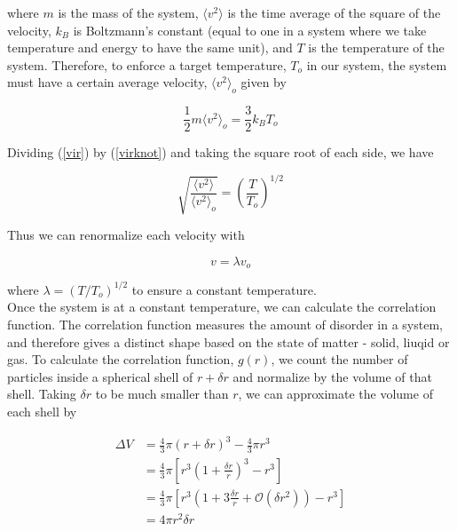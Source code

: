 \documentclass{article}
\begin{document}
\begin{multicols}{2}
\noindent where $m$ is the mass of the system, $\langle v^2 \rangle$ is the time average of the square of the velocity, $k_B$ is Boltzmann's constant (equal to one in a system where we take temperature and energy to have the same unit), and $T$ is the temperature of the system.  Therefore, to enforce a target temperature, $T_o$ in our system, the system must have a certain average velocity, $\langle v^2 \rangle _o$ given by

\begin{equation}
\label{virknot}
\frac{1}{2}m \langle v^2 \rangle _o = \frac{3}{2} k_B T_o
\end{equation}

Dividing (\ref{vir}) by (\ref{virknot}) and taking the square root of each side, we have

\begin{equation}
\sqrt{\frac{\langle v^2 \rangle}{\langle v^2 \rangle _o}} = \left ( \frac{T}{T_o} \right ) ^{1/2}
\end{equation}

\noindent Thus we can renormalize each velocity with 

\begin{equation}
v = \lambda v_o
\end{equation}

\noindent where $\lambda = (T/T_o)^{1/2}$ to ensure a constant temperature.  \\

Once the system is at a constant temperature, we can calculate the correlation function.  The correlation function measures the amount of disorder in a system, and therefore gives a distinct shape based on the state of matter - solid, liuqid or gas.  To calculate the correlation function, $g(r)$, we count the number of particles inside a spherical shell of $r + \delta r$ and normalize by the volume of that shell.  Taking $\delta r$ to be much smaller than $r$, we can approximate the volume of each shell by

\begin{equation}
\begin{split}
\Delta V & = \frac{4}{3} \pi (r+\delta r)^3 - \frac{4}{3} \pi r^3 \\
& = \frac{4}{3} \pi \left [ r^3 \left (1+\frac{\delta r}{r} \right )^3 - r^3 \right ] \\
& = \frac{4}{3} \pi \left [ r^3 \left ( 1 + 3\frac{\delta r}{r} + \mathcal{O} (\delta r ^2) \right ) - r^3 \right ] \\
& = 4 \pi r^2 \delta r
\end{split}
\end{equation}


\end{multicols}
\end{document}
